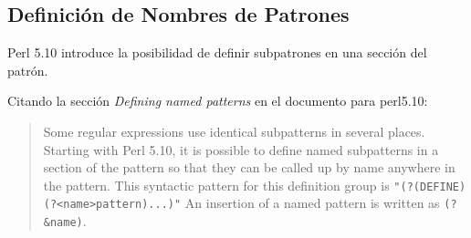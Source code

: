 \begin{exercise}
\begin{itemize}
\begin{rawhtml}
\end{rawhtml}
\end{itemize}
\end{exercise}

\subsection{Definición de Nombres de Patrones}
Perl 5.10 introduce la posibilidad de definir 
subpatrones en una sección del patrón. 


Citando la sección {\it Defining named patterns}
en el documento  para
perl5.10:

\begin{it}
\begin{quotation}
Some regular expressions use identical subpatterns in several
places. Starting with Perl 5.10, it is possible to define named
subpatterns in a section of the pattern so that they can be called up by
name anywhere in the pattern. 
This syntactic pattern for this definition group is
\verb|"(?(DEFINE)(?<name>pattern)...)"|  
An
insertion of a named pattern is written as \verb"(?&name)".
\end{quotation}
\end{it}

